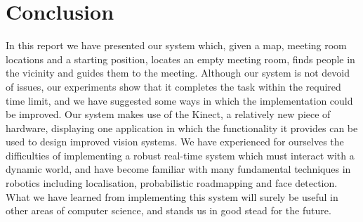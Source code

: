 \documentclass[conference]{IEEEtran}
\begin{document}
\section{Conclusion}
In this report we have presented our system which, given a map, meeting room locations and a starting position, locates an empty meeting room, finds people in the vicinity and guides them to the meeting. Although our system is not devoid of issues, our experiments show that it completes the task within the required time limit, and we have suggested some ways in which the implementation could be improved. Our system makes use of the Kinect, a relatively new piece of hardware, displaying one application in which the functionality it provides can be used to design improved vision systems. We have experienced for ourselves the difficulties of implementing a robust real-time system which must interact with a dynamic world, and have become familiar with many fundamental techniques in robotics including localisation, probabilistic roadmapping and face detection. What we have learned from implementing this system will surely be useful in other areas of computer science, and stands us in good stead for the future.


\end{document}
